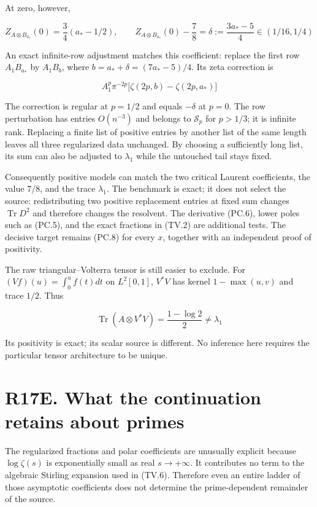 \documentclass[
  11pt,
]{book}
\begin{document}
At zero, however,

\[
Z_{A\otimes B_{a_*}}(0)=\frac34(a_*-1/2),\qquad
Z_{A\otimes B_{a_*}}(0)-\frac78
=\delta:=\frac{3a_*-5}{4}\in(1/16,1/4)
\tag{BM.4}
\]

An exact infinite-row adjustment matches this coefficient: replace the
first row \(A_1B_{a_*}\) by \(A_1B_b\), where
\(b=a_*+\delta=(7a_*-5)/4\). Its zeta correction is

\[
A_1^p\pi^{-2p}\bigl[\zeta(2p,b)-\zeta(2p,a_*)\bigr]
\tag{BM.5}
\]

The correction is regular at \(p=1/2\) and equals \(-\delta\) at
\(p=0\). The row perturbation has entries \(O(n^{-3})\) and belongs to
\(\mathcal S_p\) for \(p>1/3\); it is infinite rank. Replacing a finite
list of positive entries by another list of the same length leaves all
three regularized data unchanged. By choosing a sufficiently long list,
its sum can also be adjusted to \(\lambda_1\) while the untouched tail
stays fixed.

Consequently positive models can match the two critical Laurent
coefficients, the value \(7/8\), and the trace \(\lambda_1\). The
benchmark is exact; it does not select the source: redistributing two
positive replacement entries at fixed sum changes
\(\operatorname{Tr}D^2\) and therefore changes the resolvent. The
derivative (PC.6), lower poles such as (PC.5), and the exact fractions
in (TV.2) are additional tests. The decisive target remains (PC.8) for
every \(x\), together with an independent proof of positivity.

The raw triangular--Volterra tensor is still easier to exclude. For
\((Vf)(u)=\int_0^u f(t)dt\) on \(L^2[0,1]\), \(V^*V\) has kernel
\(1-\max(u,v)\) and trace \(1/2\). Thus

\[
\operatorname{Tr}(A\otimes V^*V)=\frac{1-\log2}{2}\ne\lambda_1
\tag{BM.6}
\]

Its positivity is exact; its scalar source is different. No inference
here requires the particular tensor architecture to be unique.

\section{R17E. What the continuation retains about
primes}\label{r17e.-what-the-continuation-retains-about-primes}

The regularized fractions and polar coefficients are unusually explicit
because \(\log\zeta(s)\) is exponentially small as real \(s\to+\infty\).
It contributes no term to the algebraic Stirling expansion used in
(TV.6). Therefore even an entire ladder of those asymptotic coefficients
does not determine the prime-dependent remainder of the source.
\end{document}
